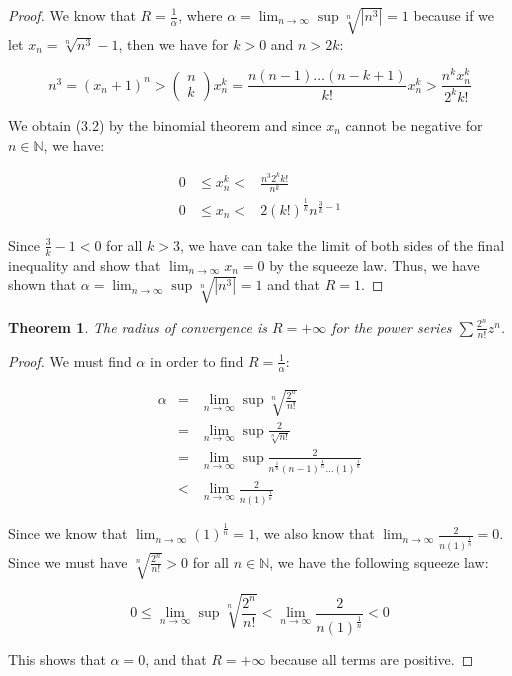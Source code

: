 \documentclass[psamsfonts]{amsart}
\newtheorem{thm}{Theorem}[section]
\theoremstyle{definition}
\theoremstyle{remark}
\numberwithin{equation}{section}
\begin{document}
\begin{proof}
We know that $R = \frac{1}{\alpha}$, where $\alpha = \lim_{n \to \infty} \sup \sqrt[n]{|n^3|} = 1$ because if we let $x_n = \sqrt[n]{n^3} - 1$, then we have for $k > 0$ and $n > 2k$:

\begin{equation}
n^3 = (x_n + 1)^n > \left( \begin{array}{c}
n \\
k \end{array} \right) x_n^k = \frac{n(n-1)\ldots(n-k+1)}{k!} x_n^k > \frac{n^k x_n^k}{2^k k!}
\end{equation}

We obtain (3.2) by the binomial theorem and since $x_n$ cannot be negative for $ n \in \mathbb{N}$, we have:

\begin{eqnarray}
0 &\leq x_n^k <& \frac{n^3 2^k k!}{n^k} \\
0 &\leq x_n <&  2 (k!)^{\frac{1}{k}} n^{\frac{3}{k} - 1} 
\end{eqnarray}

Since $\frac{3}{k} - 1 < 0$ for all $k > 3$, we have can take the limit of both sides of the final inequality and show that $\lim_{n \to \infty} x_n = 0$ by the squeeze law. Thus, we have shown that $\alpha = \lim_{n \to \infty} \sup \sqrt[n]{|n^3|} = 1$ and that $R = 1$. 

\end{proof}

\begin{thm}
The radius of convergence is $R = + \infty $ for the power series $\sum \frac{2^n}{n!} z^n$. 
\end{thm}

\begin{proof}
We must find $\alpha$ in order to find $R = \frac{1}{\alpha}$:

\begin{eqnarray}
\alpha &=& \lim_{n \to \infty} \sup \sqrt[n]{\frac{2^n}{n!}} \\
&=& \lim_{n \to \infty} \sup \frac{2}{\sqrt[n]{n!}} \\
&=& \lim_{n \to \infty} \sup \frac{2}{n^{\frac{1}{n}} (n-1)^{\frac{1}{n}} \ldots (1)^{\frac{1}{n}}} \\
&<& \lim_{n \to \infty} \frac{2}{n (1)^{\frac{1}{n}}} 
\end{eqnarray}

Since we know that $\lim_{n \to \infty} (1)^{\frac{1}{n}} = 1$, we also know that $\lim_{n \to \infty} \frac{2}{n (1)^{\frac{1}{n}}} = 0$. Since we must have $\sqrt[n]{\frac{2^n}{n!}} > 0$ for all $n \in \mathbb{N}$, we have the following squeeze law:

\begin{equation}
0 \leq \lim_{n \to \infty} \sup \sqrt[n]{\frac{2^n}{n!}} < \lim_{n \to \infty} \frac{2}{n (1)^{\frac{1}{n}}} < 0
\end{equation}

This shows that $\alpha = 0$, and that $R = + \infty$ because all terms are positive. 
\end{proof}
\end{document}
